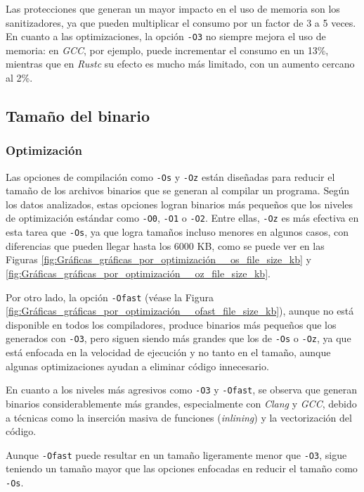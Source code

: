 Las protecciones que generan un mayor impacto en el uso de memoria son los sanitizadores, ya que pueden multiplicar el consumo por un factor de 3 a 5 veces. En cuanto a las optimizaciones, la opción \texttt{-O3} no siempre mejora el uso de memoria: en \emph{GCC}, por ejemplo, puede incrementar el consumo en un 13\%, mientras que en \emph{Rustc} su efecto es mucho más limitado, con un aumento cercano al 2\%.

\subsection{Tamaño del binario}

\subsubsection{\texorpdfstring{\textbf{Optimización}}{Optimización}}

Las opciones de compilación como \texttt{-Os} y \texttt{-Oz} están
diseñadas para reducir el tamaño de los archivos binarios que se generan
al compilar un programa.
Según los datos analizados, estas opciones logran binarios más pequeños
que los niveles de optimización estándar como \texttt{-O0}, \texttt{-O1}
o \texttt{-O2}. Entre ellas, \texttt{-Oz} es más efectiva en esta tarea
que \texttt{-Os}, ya que logra tamaños incluso menores en algunos casos,
con diferencias que pueden llegar hasta los 6000 KB, como se puede ver
en las Figuras \ref{fig:Gráficas_gráficas_por_optimización__os_file_size_kb} y 
\ref{fig:Gráficas_gráficas_por_optimización__oz_file_size_kb}.

Por otro lado, la opción \texttt{-Ofast} (véase la Figura 
\ref{fig:Gráficas_gráficas_por_optimización__ofast_file_size_kb}), aunque no está disponible en
todos los compiladores, produce binarios más pequeños que los generados
con \texttt{-O3}, pero siguen siendo más grandes que los de \texttt{-Os}
o \texttt{-Oz}, ya que está enfocada en la velocidad de ejecución y no
tanto en el tamaño, aunque algunas optimizaciones ayudan a eliminar
código innecesario.

En cuanto a los niveles más agresivos como \texttt{-O3} y
\texttt{-Ofast}, se observa que generan binarios considerablemente más
grandes, especialmente con \emph{Clang} y \emph{GCC}, debido a
técnicas como la inserción masiva de funciones (\emph{inlining}) y la
vectorización del código.

Aunque \texttt{-Ofast} puede resultar en un tamaño ligeramente menor que
\texttt{-O3}, sigue teniendo un tamaño mayor que las opciones enfocadas
en reducir el tamaño como \texttt{-Os}.

